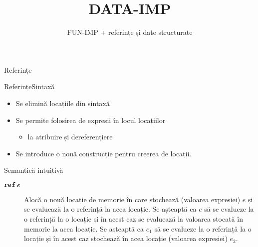 \documentclass[xcolor=pdftex,romanian,colorlinks]{beamer}
\title[SLP---Tipuri de date]{DATA-IMP}
\subtitle{FUN-IMP + referințe și date structurate}
\begin{document}
\maketitle

\begin{section}{Referințe}
\begin{frame}{Referințe}{Sintaxă}
\begin{block}{}
\begin{itemize}
\item Se elimină locațiile din sintaxă 
\item Se permite folosirea de expresii în locul locațiilor 
\begin{itemize}\item la atribuire și dereferențiere \end{itemize}
\item Se introduce o nouă construcție pentru creerea de locații.
\end{itemize}
\end{block}

\end{frame}

\begin{frame}{Semantică intuitivă}
\begin{description}
\item[$\mathrel{\text{\ttfamily ref}} e$] Alocă o nouă locație de memorie în care stochează (valoarea expresiei) $e$ și se evaluează la o referință la acea locație.
\vitem[$\terminal{!} e$] Se așteaptă ca $e$ să se evalueze la o referință la o locație și în acest caz se evaluează la valoarea stocată în memorie la acea locație.
\vitem[$e_1 \terminal{:=} e_2$] Se așteaptă ca $e_1$ să se evalueze la o referință la o locație și în acest caz stochează în acea locație (valoarea expresiei) $e_2$.
\end{description}
\end{frame}



\end{section}
\end{document}
